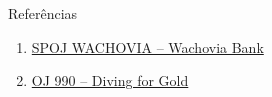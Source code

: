 \begin{frame}[fragile]{Referências}

    \begin{enumerate}
        \item \href{https://www.spoj.com/problems/WACHOVIA/}{SPOJ WACHOVIA -- Wachovia Bank} 

        \item \href{https://onlinejudge.org/index.php?option=onlinejudge&page=show_problem&problem=931}{OJ 990 -- Diving for Gold}

    \end{enumerate}

\end{frame}
